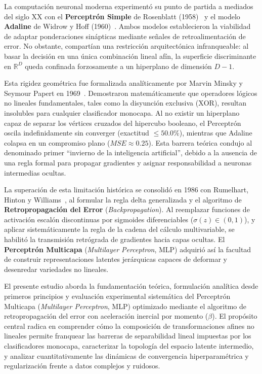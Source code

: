 \documentclass[11pt,letterpaper]{article}
\begin{document}
La computación neuronal moderna experimentó su punto de partida a mediados del siglo XX con el \textbf{Perceptrón Simple} de Rosenblatt (1958)~\cite{rosenblatt1958} y el modelo \textbf{Adaline} de Widrow y Hoff (1960)~\cite{widrow1960}. Ambos modelos establecieron la viabilidad de adaptar ponderaciones sinápticas mediante señales de retroalimentación de error. No obstante, compartían una restricción arquitectónica infranqueable: al basar la decisión en una única combinación lineal afín, la superficie discriminante en $\mathbb{R}^D$ queda confinada forzosamente a un hiperplano de dimensión $D-1$.

Esta rigidez geométrica fue formalizada analíticamente por Marvin Minsky y Seymour Papert en 1969~\cite{minsky1969}. Demostraron matemáticamente que operadores lógicos no lineales fundamentales, tales como la disyunción exclusiva ($\text{XOR}$), resultan insolubles para cualquier clasificador monocapa. Al no existir un hiperplano capaz de separar los vértices cruzados del hipercubo booleano, el Perceptrón oscila indefinidamente sin converger (exactitud $\le 50.0\%$), mientras que Adaline colapsa en un compromiso plano ($MSE \approx 0.25$). Esta barrera teórica condujo al denominado primer ``invierno de la inteligencia artificial'', debido a la ausencia de una regla formal para propagar gradientes y asignar responsabilidad a neuronas intermedias ocultas.

La superación de esta limitación histórica se consolidó en 1986 con Rumelhart, Hinton y Williams~\cite{rumelhart1986}, al formular la regla delta generalizada y el algoritmo de \textbf{Retropropagación del Error} (\textit{Backpropagation}). Al reemplazar funciones de activación escalón discontinuas por sigmoides diferenciables ($\sigma(z) \in (0, 1)$), y aplicar sistemáticamente la regla de la cadena del cálculo multivariable, se habilitó la transmisión retrógrada de gradientes hacia capas ocultas. El \textbf{Perceptrón Multicapa} (\textit{Multilayer Perceptron}, MLP) adquirió así la facultad de construir representaciones latentes jerárquicas capaces de deformar y desenredar variedades no lineales.

El presente estudio aborda la fundamentación teórica, formulación analítica desde primeros principios y evaluación experimental sistemática del Perceptrón Multicapa (\textit{Multilayer Perceptron}, MLP) optimizado mediante el algoritmo de retropropagación del error con aceleración inercial por momento ($\beta$). El propósito central radica en comprender cómo la composición de transformaciones afines no lineales permite franquear las barreras de separabilidad lineal impuestas por los clasificadores monocapa, caracterizar la topología del espacio latente intermedio, y analizar cuantitativamente las dinámicas de convergencia hiperparamétrica y regularización frente a datos complejos y ruidosos.
\end{document}
